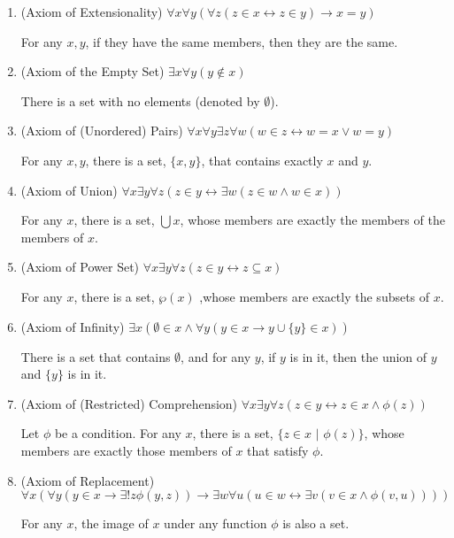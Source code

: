 \documentclass[11pt]{article}
\theoremstyle{definition}
\begin{document}
\begin{enumerate}
\item (Axiom of Extensionality) $\forall x \forall y (\forall z (z \in x \leftrightarrow z \in y) \rightarrow x = y)$

For any $x, y$, if they have the same members, then they are the same.

\item (Axiom of the Empty Set) $\exists x \forall y (y \notin x)$

There is a set with no elements (denoted by $\emptyset$).
\item (Axiom of (Unordered) Pairs) $\forall x \forall y \exists z \forall w (w \in z \leftrightarrow w = x \lor w = y)$

For any $x, y$, there is a set, $\{x, y\}$, that contains exactly $x$ and $y$.

\item (Axiom of Union) $\forall x \exists y \forall z (z \in y \leftrightarrow \exists w (z \in w \land w \in x))$

For any $x$, there is a set, $\bigcup x$, whose members are exactly the members of the members of $x$.

\item (Axiom of Power Set) $\forall x \exists y \forall z (z \in y \leftrightarrow z \subseteq x)$

For any $x$, there is a set, $\wp(x)$ ,whose members are exactly the subsets of $x$.

\item (Axiom of Infinity) $\exists x (\emptyset \in x \land \forall y (y \in x \rightarrow y \cup \{y\} \in x))$

There is a set that contains $\emptyset$, and for any $y$, if $y$ is in it, then the union of $y$ and $\{y\}$ is in it.

\item (Axiom of (Restricted) Comprehension) $\forall x \exists y \forall z (z \in y \leftrightarrow z \in x \land \phi(z))$

Let $\phi$ be a condition. For any $x$, there is a set, $\{z \in x \, \, | \, \, \phi(z) \}$, whose members are exactly those members of $x$ that satisfy $\phi$.

\item (Axiom of Replacement) $\forall x (\forall y (y \in x \rightarrow \exists ! z \phi(y, z)) \rightarrow \exists w \forall u (u \in w \leftrightarrow \exists v (v \in x \land \phi(v, u))))$

For any $x$, the image of $x$ under any function $\phi$ is also a set.


\end{enumerate}
\end{document}
